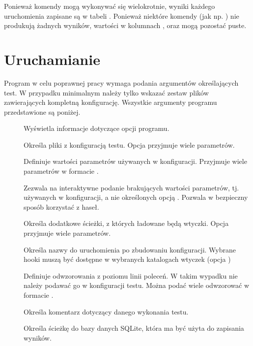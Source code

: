 \documentclass[00-praca-magisterska.tex]{subfiles}
\begin{document}
Ponieważ komendy mogą wykonywać się wielokrotnie, wyniki każdego uruchomienia
zapisane są w tabeli . Ponieważ niektóre komendy (jak np.
) nie produkują żadnych wyników, wartości w kolumnach
,  oraz  mogą pozostać puste.

\section{Uruchamianie}

Program  w celu poprawnej pracy wymaga podania argumentów
określających test. W przypadku minimalnym należy tylko wskazać zestaw plików
zawierających kompletną konfigurację. Wszystkie argumenty programu przedstawione
są poniżej.

\begin{description}
\item[]

Wyświetla informacje dotyczące opcji programu.

\item[]

Określa pliki z konfiguracją testu. Opcja przyjmuje wiele parametrów.

\item[]

Definiuje wartości parametrów używanych w konfiguracji. Przyjmuje wiele
parametrów w formacie .

\item[]

Zezwala na interaktywne podanie brakujących wartości parametrów, tj. używanych w
konfiguracji, a nie określonych opcją . Pozwala w bezpieczny sposób
korzystać z haseł.

\item[]

Określa dodatkowe ścieżki, z których ładowane będą wtyczki. Opcja przyjmuje
wiele parametrów.

\item[]

Określa nazwy  do uruchomienia po zbudowaniu konfiguracji.
Wybrane hooki muszą być dostępne w wybranych katalogach wtyczek (opcja
)

\item[]

Definiuje odwzorowania z poziomu linii poleceń. W takim wypadku nie należy
podawać go w konfiguracji testu. Można podać wiele odwzorować w formacie
.

\item[]

Określa komentarz dotyczący danego wykonania testu.

\item[]

Określa ścieżkę do bazy danych SQLite, która ma być użyta do zapisania wyników.

\end{description}
\end{document}

